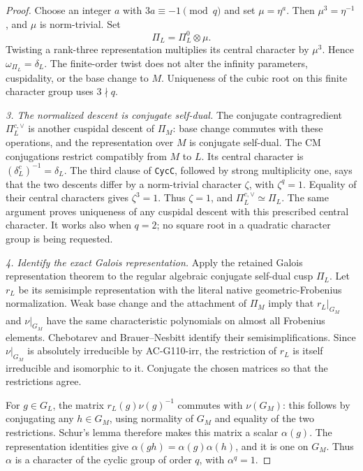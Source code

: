 \begin{proof}
Choose an integer \(a\) with \(3a\equiv-1\pmod q\)
and set \(\mu=\eta^a\). Then
\(\mu^3=\eta^{-1}\), and \(\mu\) is norm-trivial.
Set
\[
                    \Pi_L=\Pi_L^0\otimes\mu.
 \tag{G111.6}
\]
Twisting a rank-three representation multiplies its central
character by \(\mu^3\). Hence
\(\omega_{\Pi_L}=\delta_L\). The finite-order twist
does not alter the infinity parameters, cuspidality, or
the base change to \(M\). Uniqueness of the cubic root
on this finite character group uses \(3\nmid q\).

\emph{3. The normalized descent is conjugate self-dual.}
The conjugate contragredient \(\Pi_L^{c,\vee}\) is
another cuspidal descent of \(\Pi_M\): base change
commutes with these operations, and the representation
over \(M\) is conjugate self-dual. The CM conjugations
restrict compatibly from \(M\) to \(L\).
Its central character is
\((\delta_L^c)^{-1}=\delta_L\).
The third clause of \texttt{CycC}, followed by strong
multiplicity one, says that the two descents differ by
a norm-trivial character \(\zeta\), with \(\zeta^q=1\).
Equality of their central characters gives
\(\zeta^3=1\). Thus \(\zeta=1\), and
\(\Pi_L^{c,\vee}\simeq\Pi_L\).
The same argument proves uniqueness of any cuspidal
descent with this prescribed central character. It works
also when \(q=2\); no square root in a quadratic
character group is being requested.

\emph{4. Identify the exact Galois representation.}
Apply the retained Galois representation theorem to the
regular algebraic conjugate self-dual cusp \(\Pi_L\).
Let \(r_L\) be its semisimple representation with the
literal native geometric-Frobenius normalization.
Weak base change and the attachment of \(\Pi_M\) imply
that \(r_L|_{G_M}\) and \(\nu|_{G_M}\) have the same
characteristic polynomials on almost all Frobenius
elements. Chebotarev and Brauer--Nesbitt identify their
semisimplifications. Since \(\nu|_{G_M}\) is absolutely
irreducible by AC-G110-irr, the restriction of \(r_L\)
is itself irreducible and isomorphic to it. Conjugate
the chosen matrices so that the restrictions agree.

For \(g\in G_L\), the matrix
\(r_L(g)\nu(g)^{-1}\) commutes with \(\nu(G_M)\):
this follows by conjugating any \(h\in G_M\), using
normality of \(G_M\) and equality of the two restrictions.
Schur's lemma therefore makes this matrix a scalar
\(\alpha(g)\). The representation identities give
\(\alpha(gh)=\alpha(g)\alpha(h)\), and it is one on
\(G_M\). Thus \(\alpha\) is a character of the cyclic
group of order \(q\), with \(\alpha^q=1\).


\end{proof}
